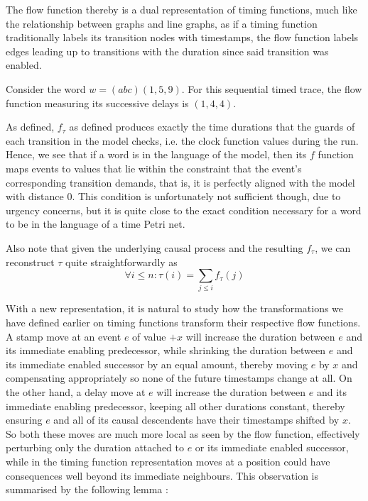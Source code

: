 \documentclass[runningheads]{llncs}
\begin{document}
	The flow function thereby is a dual representation of timing functions, much like the relationship between graphs and line graphs, as if a timing function traditionally labels its transition nodes with timestamps, the flow function labels edges leading up to transitions with the duration since said transition was enabled. 
	
	\begin{example}\label{wordandflow}
		

		Consider the word $w = (abc)(1, 5, 9)$. For this sequential timed trace, the flow function measuring its successive delays is $(1, 4, 4)$. 
	\end{example}
	
	As defined, $f_\tau$ as defined produces exactly the time durations that the guards of each transition in the model checks, i.e. the clock function values during the run.
	Hence, we see that if a word is in the language of the model, then its $f$ function maps events to values that lie within the constraint that the event's corresponding transition demands, that is, it is perfectly aligned with the model with distance 0. 
	This condition is unfortunately not sufficient though, due to urgency concerns, but it is quite close to the exact condition necessary for a word to be in the language of a time Petri net. 
	
	Also note that given the underlying causal process and the resulting $f_\tau$, we can reconstruct $\tau$ quite straightforwardly as $$\forall i \leq n : \tau(i) = \sum_{j \leq i} f_\tau(j)$$
	
	With a new representation, it is natural to study how the transformations we have defined earlier on timing functions transform their respective flow functions. A stamp move at an event $e$ of value $+x$ will increase the duration between $e$ and its immediate enabling predecessor, while shrinking the duration between $e$ and its immediate enabled successor by an equal amount, thereby moving $e$ by $x$ and compensating appropriately so none of the future timestamps change at all. 
	On the other hand, a delay move at $e$ will increase the duration between $e$ and its immediate enabling predecessor, keeping all other durations constant, thereby ensuring $e$ and all of its causal descendents have their timestamps shifted by $x$. 
	So both these moves are much more local as seen by the flow function, effectively perturbing only the duration attached to $e$ or its immediate enabled successor, while in the timing function representation moves at a position could have consequences well beyond its immediate neighbours. 
	This observation is summarised by the following lemma : 
	
\end{document}
